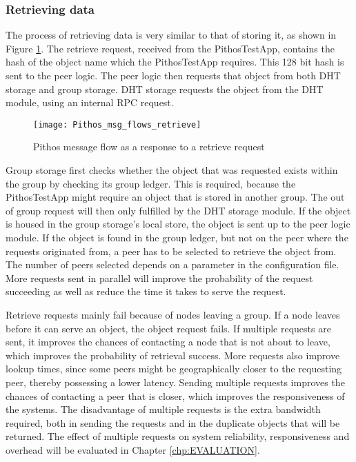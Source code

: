     \subsubsection{Retrieving data}
    \label{retrieve_implementation}

    The process of retrieving data is very similar to that of storing it, as shown in Figure \ref{fig_pithos_msg_flow_retrieve}. The retrieve request, received from the PithosTestApp, contains the hash of the object name which the PithosTestApp requires. This 128 bit hash is sent to the peer logic. The peer logic then requests that object from both DHT storage and group storage. DHT storage requests the object from the DHT module, using an internal RPC request.

\begin{figure}[htbp]
 \centering
 \texttt{[image: Pithos\_msg\_flows\_retrieve]}
 \caption{Pithos message flow as a response to a retrieve request}
 \label{fig_pithos_msg_flow_retrieve}
\end{figure}

    Group storage first checks whether the object that was requested exists within the group by checking its group ledger. This is required, because the PithosTestApp might require an object that is stored in another group. The out of group request will then only fulfilled by the DHT storage module. If the object is housed in the group storage's local store, the object is sent up to the peer logic module. If the object is found in the group ledger, but not on the peer where the requests originated from, a peer has to be selected to retrieve the object from. The number of peers selected depends on a parameter in the configuration file. More requests sent in parallel will improve the probability of the request succeeding as well as reduce the time it takes to serve the request.

    Retrieve requests mainly fail because of nodes leaving a group. If a node leaves before it can serve an object, the object request fails. If multiple requests are sent, it improves the chances of contacting a node that is not about to leave, which improves the probability of retrieval success. More requests also improve lookup times, since some peers might be geographically closer to the requesting peer, thereby possessing a lower latency. Sending multiple requests improves the chances of contacting a peer that is closer, which improves the responsiveness of the systems. The disadvantage of multiple requests is the extra bandwidth required, both in sending the requests and in the duplicate objects that will be returned. The effect of multiple requests on system reliability, responsiveness and overhead will be evaluated in Chapter \ref{chp:EVALUATION}.

